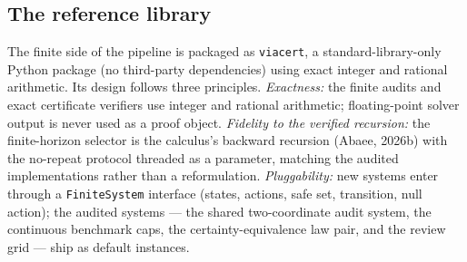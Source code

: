 \documentclass[10pt,twocolumn]{article}
\theoremstyle{plain}
\theoremstyle{definition}
\theoremstyle{remark}
\begin{document}
\subsection{The reference library}\label{library}

The finite side of the pipeline is packaged as \texttt{viacert}, a
standard-library-only Python package (no third-party dependencies) using
exact integer and rational arithmetic.
Its design follows three principles. \emph{Exactness:} the finite audits and exact certificate verifiers use
integer and rational arithmetic; floating-point solver output is never used
as a proof object.
\emph{Fidelity to the verified recursion:} the finite-horizon selector is the
calculus's backward recursion (Abaee, 2026b) with the no-repeat protocol
threaded as a parameter, matching the audited implementations rather than a
reformulation. \emph{Pluggability:} new systems enter through a
\texttt{FiniteSystem} interface (states, actions, safe set, transition, null
action); the audited systems --- the shared two-coordinate audit system, the
continuous benchmark caps, the certainty-equivalence law pair, and the
review grid --- ship as default instances.
\end{document}
